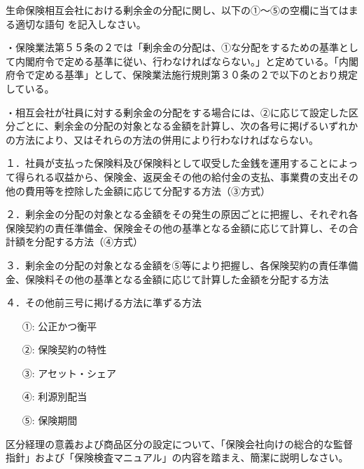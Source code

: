 \documentclass[report,gutter=10mm,fore-edge=10mm,uplatex,dvipdfmx]{jlreq}
\begin{document}

生命保険相互会社における剰余金の分配に関し、以下の①～⑤の空欄に当てはまる適切な語句
を記入しなさい。

・保険業法第５５条の２では「剰余金の分配は、①な分配をするための基準として内閣府令で定める基準に従い、行わなければならない。」と定めている。「内閣府令で定める基準」として、保険業法施行規則第３０条の２で以下のとおり規定している。

・相互会社が社員に対する剰余金の分配をする場合には、②に応じて設定した区分ごとに、剰余金の分配の対象となる金額を計算し、次の各号に掲げるいずれかの方法により、又はそれらの方法の併用により行わなければならない。

１．社員が支払った保険料及び保険料として収受した金銭を運用することによって得られる収益から、保険金、返戻金その他の給付金の支払、事業費の支出その他の費用等を控除した金額に応じて分配する方法（③方式）

２．剰余金の分配の対象となる金額をその発生の原因ごとに把握し、それぞれ各保険契約の責任準備金、保険金その他の基準となる金額に応じて計算し、その合計額を分配する方法（④方式）

３．剰余金の分配の対象となる金額を⑤等により把握し、各保険契約の責任準備金、保険料その他の基準となる金額に応じて計算した金額を分配する方法

４．その他前三号に掲げる方法に準ずる方法

\answer{}
\begin{itemize}
\item[ ①: ] 公正かつ衡平
\item[ ②: ] 保険契約の特性
\item[ ③: ] アセット・シェア
\item[ ④: ] 利源別配当
\item[ ⑤: ] 保険期間
\end{itemize}

区分経理の意義および商品区分の設定について、「保険会社向けの総合的な監督指針」および「保険検査マニュアル」の内容を踏まえ、簡潔に説明しなさい。

\answer{}
\end{document}
